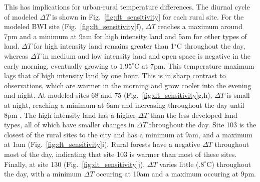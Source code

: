  This has implications for urban-rural temperature differences. The diurnal cycle of modeled $\Delta T$ is shown in Fig.~\ref{fig:dt_sensitivity} for each rural site. 
 For the modeled BWI site (Fig.~\ref{fig:dt_sensitivity}f), $\Delta T$ reaches a maximum around 7pm and a minimum at 9am for high intensity land and 5am for other types of land. $\Delta T$ for high intensity land remains greater than 1$^\circ$C throughout the day, whereas $\Delta T$ in medium and low intensity land and open space is negative in the early morning, eventually growing to $1.95^\circ$C at 7pm. This temperature maximum lags that of high intensity land by one hour. This is in sharp contrast to observations, which are warmer in the morning and grow cooler into the evening and night. 
 At modeled sites 68 and 75 (Fig.~\ref{fig:dt_sensitivity}g,h), $\Delta T$ is small at night, reaching a minimum at 6am and increasing throughout the day until 8pm . The high intensity land has a higher $\Delta T$ than the less developed land types, all of which have smaller changes in $\Delta T$ throughout the day. 
Site 103 is the closest of the rural sites to the city  and has a minimum at 9am, and a maximum at 1am (Fig.~\ref{fig:dt_sensitivity}i). 
Rural forests have a negative $\Delta T$ throughout most of the day, indicating that site 103 is warmer than most of these sites. 
Finally, at site 130 (Fig.~\ref{fig:dt_sensitivity}j), $\Delta T$ varies little ($.8^\circ $C) throughout the day, with a minimum $\Delta T$ occuring at 10am and a maximum occuring at 9pm. 

